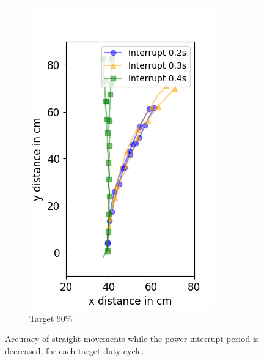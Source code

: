 \begin{figure}
\begin{subfigure}[b]{0.32\textwidth}
		\includegraphics[width=\textwidth]{pics/figure_90.png}
		\caption{Target 90\%}
		\label{fig:target_90}
	\end{subfigure}
	\caption{Accuracy of straight movements while the power interrupt period is decreased, for each target duty cycle.}
	\label{fig:decreasing_power_period}
\end{figure}

